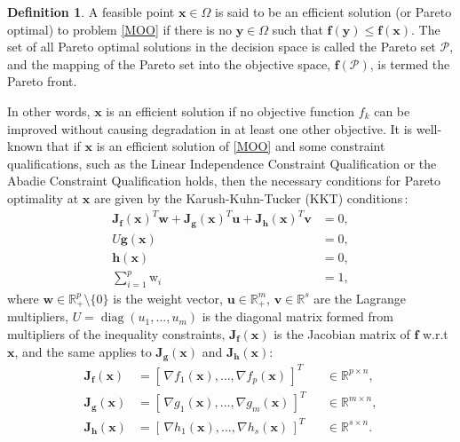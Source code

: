 \documentclass[11pt,pdflatex,sn-mathphys-ay]{sn-jnl}%
\theoremstyle{definition}
\theoremstyle{thmstyleone}%
\theoremstyle{thmstyletwo}%
\theoremstyle{thmstylethree}%
\newtheorem{definition}{Definition}%
\newcommand{\bb}[1]{\mathbf{#1}}
\begin{document}
	\begin{definition}
		A feasible point $\bm{x}\in \Omega$ is said to be an efficient solution (or Pareto optimal) to problem \eqref{MOO} if there is no $\bm{y}\in \Omega$ such that 
		$\bm{f}(\bm{y}) \leq \bm{f}(\bm{x}).$
		The set of all Pareto optimal solutions in the decision space is called the Pareto set $\mathcal{P}$, and the mapping of the Pareto set into the objective space, $\bm{f}(\mathcal{P})$, is termed the Pareto front. 
	\end{definition}
	In other words, $\bm{x}$ is an efficient solution if no objective function \( f_k \) can be improved without causing degradation in at least one other objective.
	It is well-known that if $\bm{x}$ is an efficient solution of \eqref{MOO} and some constraint qualifications, such as the Linear Independence Constraint Qualification or the Abadie Constraint Qualification holds, then the necessary conditions for Pareto optimality at $\bm{x}$ are given by the Karush-Kuhn-Tucker (KKT) conditions\,\cite{kuhn1951nonlinear}:
	\begin{subequations} \label{KKT}
		\begin{align}
			\bb{J}_{\bm{f}}(\bm{x})^T \bb{w} + \bb{J}_{\bm{g}}(\bm{x})^T \bm{u} + \bb{J}_{\bm{h}}(\bm{x})^T \bm{v} &= 0, \label{eq:KKT_stationarity} \\
			U \bm{g}(\bm{x}) &= 0, \label{eq:KKT_complementarity} \\
			\bm{h}(\bm{x}) &= 0, \label{eq:KKT_feasibility}\\
			\sum_{i=1}^p \text{w}_i & = 1, \label{eq:KKT_c}
		\end{align}
	\end{subequations}
	\noindent where \( \bb{w} \in \mathbb{R}_+^p \setminus \{0\} \) is the weight vector, \( \bm{u} \in \mathbb{R}_+^m \), \( \bm{v} \in \mathbb{R}^s \) are the Lagrange multipliers, \( U = \operatorname{diag}(u_1, \ldots, u_m) \) is the diagonal matrix formed from multipliers of the inequality constraints, $\bb{J}_{\bm{f}}(\bm{x})$ is the Jacobian matrix of ${\bm{f}}$ w.r.t $\bm{x}$, and the same applies to $\bb{J}_{\bm{g}}(\bm{x})$ and $\bb{J}_{\bm{h}}(\bm{x})$:
	\[
	\begin{aligned}
		\bb{J}_{\bm{f}}(\bm{x}) &= [\,\nabla f_1(\bm{x}), \dots, \nabla f_p(\bm{x})\,]^T 
		&&\in \mathbb{R}^{p \times n}, \\[4pt]
		\bb{J}_{\bm{g}}(\bm{x}) &= [\,\nabla g_1(\bm{x}), \dots, \nabla g_m(\bm{x})\,]^T 
		&&\in \mathbb{R}^{m \times n}, \\[4pt]
		\bb{J}_{\bm{h}}(\bm{x}) &= [\,\nabla h_1(\bm{x}), \dots, \nabla h_s(\bm{x})\,]^T 
		&&\in \mathbb{R}^{s \times n}.
	\end{aligned}
	\]
\end{document}
